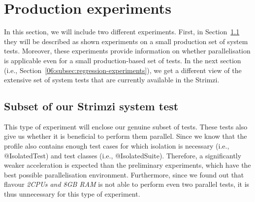 
\section{Production experiments}

In this section, we will include two different experiments.
First, in Section~\ref{06:subsec:acceptance-experiments} they will be described as shown experiments on a small production set of system tests.
Moreover, these experiments provide information on whether parallelisation is applicable even for a small production-based set of tests.
In the next section (i.e., Section~\ref{06:subsec:regression-experiments}), we get a different view of the extensive set
of system tests that are currently available in the Strimzi.

\subsection{Subset of our Strimzi system test}
\label{06:subsec:acceptance-experiments}

This type of experiment will enclose our genuine subset of tests.
These tests also give us whether it is beneficial to perform them parallel.
Since we know that the profile also contains enough test cases for which isolation is necessary (i.e., @IsolatedTest) and test classes (i.e., @IsolatedSuite).
Therefore, a significantly weaker acceleration is expected than the preliminary experiments, which have the best possible parallelisation environment.
Furthermore, since we found out that flavour \emph{2CPUs and 8GB RAM} is not able to perform even two parallel tests, it is thus unnecessary for this type of experiment.

